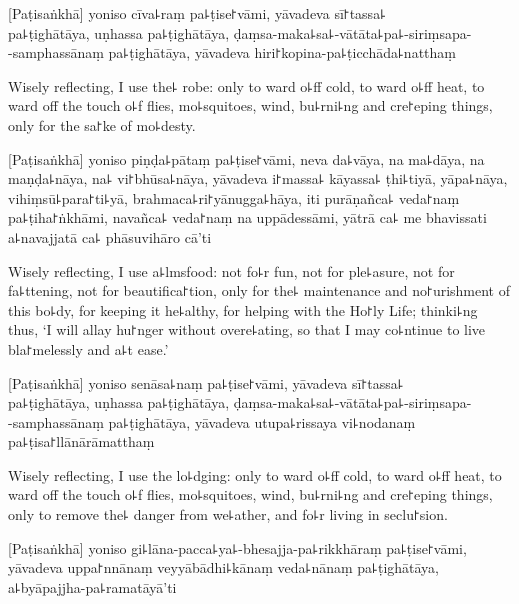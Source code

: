 
\begin{leader}
\end{leader}

[Paṭisaṅkhā] yoniso cīva꜕raṃ pa꜕ṭise꜓vāmi, yāvadeva sī꜓tassa꜕\\
pa꜕ṭighātāya, uṇhassa pa꜕ṭighātāya, ḍaṃsa-maka꜕sa꜕-vātāta꜕pa꜕-siriṃsapa-\\
-samphassānaṃ pa꜕ṭighātāya, yāvadeva hiri꜓kopina-pa꜕ṭicchāda꜕natthaṃ

\begin{english}
  Wisely reflecting, I use the꜕ robe: only to ward o꜕ff cold, to ward o꜕ff heat, to ward off the touch o꜕f flies, mo꜕squitoes, wind, bu꜕rni꜕ng and cre꜓eping things, only for the sa꜓ke of mo꜕desty.
\end{english}

[Paṭisaṅkhā] yoniso piṇḍa꜕pātaṃ pa꜕ṭise꜓vāmi, neva da꜕vāya, na ma꜕dāya, na maṇḍa꜕nāya, na꜕ vi꜓bhūsa꜕nāya, yāvadeva i꜓massa꜕ kāyassa꜕ ṭhi꜕tiyā, yāpa꜕nāya, vihiṃsū꜕para꜓ti꜕yā, brahmaca꜕ri꜓yānugga꜕hāya, iti purāṇañca꜕ veda꜓naṃ pa꜕ṭiha꜓ṅkhāmi, navañca꜕ veda꜓naṃ na uppādessāmi, yātrā ca꜕ me bhavissati a꜕navajjatā ca꜕ phāsuvihāro cā'ti

\begin{english}
  Wisely reflecting, I use a꜕lmsfood: not fo꜕r fun, not for ple꜕asure, not for fa꜕ttening, not for beautifica꜓tion, only for the꜕ maintenance and no꜓urishment of this bo꜕dy, for keeping it he꜕althy, for helping with the Ho꜓ly Life; thinki꜕ng thus, `I will allay hu꜓nger without overe꜕ating, so that I may co꜕ntinue to live bla꜓melessly and a꜕t ease.'
\end{english}

[Paṭisaṅkhā] yoniso senāsa꜕naṃ pa꜕ṭise꜓vāmi, yāvadeva sī꜓tassa꜕\\
pa꜕ṭighātāya, uṇhassa pa꜕ṭighātāya, ḍaṃsa-maka꜕sa꜕-vātāta꜕pa꜕-siriṃsapa-\\
-samphassānaṃ pa꜕ṭighātāya, yāvadeva utupa꜕rissaya vi꜕nodanaṃ pa꜕ṭisa꜓llānārāmatthaṃ

\begin{english}
  Wisely reflecting, I use the lo꜕dging: only to ward o꜕ff cold, to ward o꜕ff heat, to ward off the touch o꜕f flies, mo꜕squitoes, wind, bu꜕rni꜕ng and cre꜓eping things, only to remove the꜕ danger from we꜕ather, and fo꜕r living in seclu꜓sion.
\end{english}

[Paṭisaṅkhā] yoniso gi꜕lāna-pacca꜕ya꜕-bhesajja-pa꜕rikkhāraṃ pa꜕ṭise꜓vāmi, yāvadeva uppa꜓nnānaṃ veyyābādhi꜕kānaṃ veda꜕nānaṃ pa꜕ṭighātāya, a꜕byāpajjha-pa꜕ramatāyā'ti

